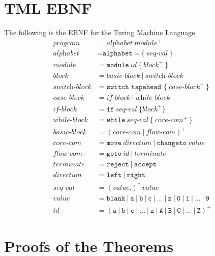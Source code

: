 \begin{appendices}
\chapter{TML EBNF}
The following is the EBNF for the Turing Machine Language.
\begin{align*}
    \textit{program} &= \textit{alphabet} \ \textit{module}^+ \\
    \textit{alphabet} &= \texttt{alphabet} \ \texttt{=} \ \texttt{\{} \ \textit{seq-val} \ \texttt{\}} \\
    \textit{module} &= \texttt{module} \ \textit{id} \ \texttt{\{} \ \textit{block}^+ \ \texttt{\}} \\
    \textit{block} &= \textit{basic-block} \ | \ \textit{switch-block} \\
    \textit{switch-block} &= \texttt{switch tapehead \{} \ \textit{case-block}^+ \ \texttt{\}} \\
    \textit{case-block} &= \textit{if-block} \ | \ \textit{while-block} \\
    \textit{if-block} &= \texttt{if} \ \textit{seq-val} \ \texttt{\{} \textit{block}^+ \texttt{\}} \\
    \textit{while-block} &= \texttt{while} \ \textit{seq-val} \ \texttt{\{} \ \textit{core-com}^+ \ \texttt{\}} \\
    \textit{basic-block} &= (\textit{core-com} \ | \ \textit{flow-com})^+ \\
    \textit{core-com} &= \texttt{move} \ \textit{direction} \ | \ \texttt{changeto} \ \textit{value} \\
    \textit{flow-com} &= \texttt{goto} \ \textit{id} \ | \ \textit{terminate} \\
    \textit{terminate} &= \texttt{reject} \ | \ \texttt{accept} \\
    \textit{direction} &= \texttt{left} \ | \ \texttt{right} \\
    \textit{seq-val} &= (\textit{value} \texttt{,})^* \ \textit{value} \\
    \textit{value} &= \texttt{blank} \ | \ \texttt{a} \ | \ \texttt{b} \ | \ \texttt{c} \ | \ \dots \ | \ \texttt{z} \ | \ \texttt{0} \ | \ \texttt{1} \ | \ \dots \ | \ \texttt{9} \\
    \textit{id} &= (\texttt{a} \ | \ \texttt{b} \ | \ \texttt{c} \ | \ \dots \ | \ \texttt{z} \ | \ \texttt{A} \ | \ \texttt{B} \ | \ \texttt{C} \ | \ \dots \ | \ \texttt{Z})^+
\end{align*}

\chapter{Proofs of the Theorems}
\setcounter{theorem}{0}


\end{appendices}
